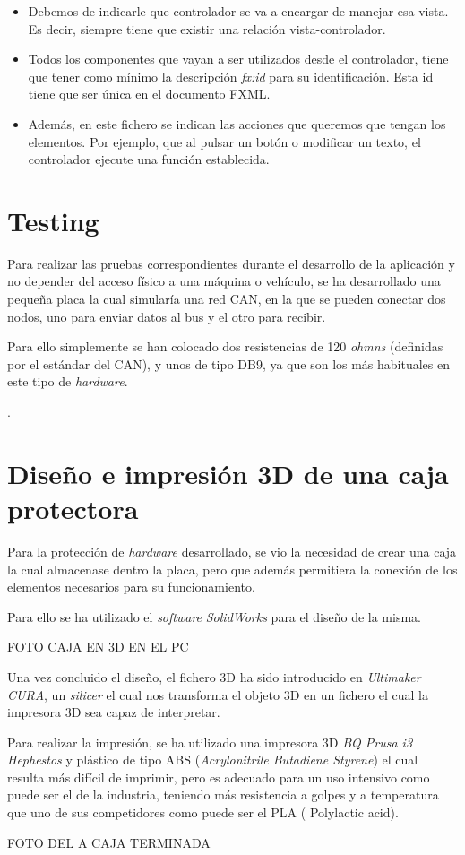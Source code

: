 \begin{itemize}

\item
Debemos de indicarle que controlador se va a encargar de manejar esa vista. Es decir, siempre tiene que existir una relación vista-controlador.
\item
Todos los componentes que vayan a ser utilizados desde el controlador, tiene que tener como mínimo la descripción \emph{fx:id} para su identificación. Esta id tiene que ser única en el documento FXML.
\item
Además, en este fichero se indican las acciones que queremos que tengan los elementos. Por ejemplo, que al pulsar un botón o modificar un texto, el controlador ejecute una función establecida.

\end{itemize}



\section{Testing}\label{testing}

Para realizar las pruebas correspondientes durante el desarrollo de la aplicación y no depender del acceso físico a una máquina o vehículo, se ha desarrollado una pequeña placa la cual simularía una red CAN, en la que se pueden conectar dos nodos, uno para enviar datos al bus y el otro para recibir.

Para ello simplemente se han colocado dos resistencias de 120 \emph{ohmns} (definidas por el estándar del CAN), y unos de tipo DB9, ya que son los más habituales en este tipo de \emph{hardware}.

.

\section{Diseño e impresión 3D de una caja protectora}\label{desarrollo_e_impresion_3d_de_una_caja_protectora}

Para la protección de \emph{hardware} desarrollado, se vio la necesidad de crear una caja la cual almacenase dentro la placa, pero que además permitiera la conexión de los elementos necesarios para su funcionamiento.

Para ello se ha utilizado el \emph{software} \emph{SolidWorks} para el diseño de la misma.

FOTO CAJA EN 3D EN EL PC

Una vez concluido el diseño, el fichero 3D ha sido introducido en \emph{Ultimaker CURA}, un \emph{silicer} el cual nos transforma el objeto 3D en un fichero el cual la impresora 3D sea capaz de interpretar.

Para realizar la impresión, se ha utilizado una impresora 3D \emph{BQ Prusa i3 Hephestos} y plástico de tipo ABS (\emph{Acrylonitrile Butadiene Styrene}) el cual resulta más difícil de imprimir, pero es adecuado para un uso intensivo como puede ser el de la industria, teniendo más resistencia a golpes y a temperatura que uno de sus competidores como puede ser el PLA ( Polylactic acid).


FOTO DEL A CAJA TERMINADA

